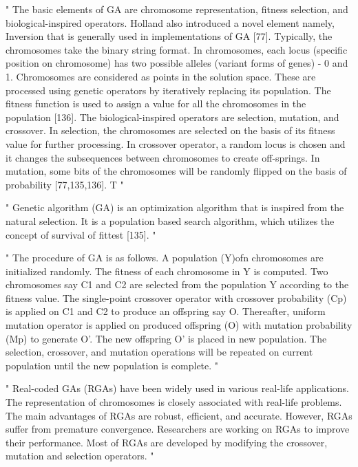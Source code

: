 "
The basic elements of GA are chromosome representation, fitness selection, and biological-inspired operators. Holland also introduced a novel element namely, Inversion that is generally used in implementations of GA [77]. Typically, the chromosomes take the binary string format. In chromosomes, each locus (specific position on chromosome) has two possible alleles (variant forms of genes) - 0 and 1. Chromosomes are considered as points in the solution space. These are processed using genetic operators by iteratively replacing its population. The fitness function is used to assign a value for all the chromosomes in the population [136]. The biological-inspired operators are selection, mutation, and crossover. In selection, the chromosomes are selected on the basis of its fitness value for further processing. In crossover operator, a random locus is chosen and it changes the subsequences between chromosomes to create off-springs. In mutation, some bits of the chromosomes will be randomly flipped on the basis of probability [77,135,136]. T
"\cite{katoch_review_2021}

"
Genetic algorithm (GA) is an optimization algorithm that is inspired from the natural selection. It is a population based search algorithm, which utilizes the concept of survival of fittest [135].
"\cite{katoch_review_2021}

"
The procedure of GA is as follows. A population (Y)ofn chromosomes are initialized randomly. The fitness of each chromosome in Y is computed. Two chromosomes say C1 and C2 are selected from the population Y according to the fitness value. The single-point crossover operator with crossover probability (Cp) is applied on C1 and C2 to produce an offspring say O. Thereafter, uniform mutation operator is applied on produced offspring (O) with mutation probability (Mp) to generate O'. The new offspring O' is placed in new population. The selection, crossover, and mutation operations will be repeated on current population until the new population is complete.
"\cite{katoch_review_2021}


"
Real-coded GAs (RGAs) have been widely used in various real-life applications. The representation of chromosomes is closely associated with real-life problems. The main advantages of RGAs are robust, efficient, and accurate. However, RGAs suffer from premature convergence. Researchers are working on RGAs to improve their performance. Most of RGAs are developed by modifying the crossover, mutation and selection operators.
"\cite{katoch_review_2021}

